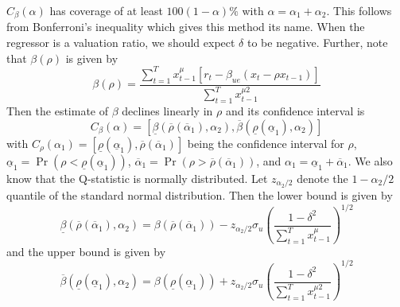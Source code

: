 \documentclass{article}
\begin{document}
$C_{\beta}(\alpha)$ has coverage of at least $100(1-\alpha) \%$ with $\alpha=\alpha_{1}+\alpha_{2}$. This follows from Bonferroni's inequality which gives this method its name.  
When the regressor is a valuation ratio, we should expect $\delta$ to be negative. Further, note that $\beta(\rho)$ is given by 
\begin{equation}
\beta(\rho)=\frac{\sum_{t=1}^{T} x_{t-1}^{\mu}\left[r_{t}-\beta_{u e}\left(x_{t}-\rho x_{t-1}\right)\right]}{\sum_{t=1}^{T} x_{t-1}^{\mu 2}}
\end{equation}
Then the estimate of $\beta$ declines linearly in $\rho$ and its confidence interval is 
\begin{equation}
C_{\beta}(\alpha)=\left[\underline{\beta}\left(\overline{\rho}\left(\overline{\alpha}_{1}\right), \alpha_{2}\right), \overline{\beta}\left(\underline{\rho}\left(\underline{\alpha}_{1}\right), \alpha_{2}\right)\right]
\end{equation}
with $C_{\rho}\left(\alpha_{1}\right)= \left[\underline{\rho}\left(\underline{\alpha}_{1}\right), \overline{\rho}\left(\overline{\alpha}_{1}\right)\right]$ being the confidence interval for $\rho$, $\underline{\alpha}_{1}=\operatorname{Pr}\left(\rho<\underline{\rho}\left(\underline{\alpha}_{1}\right)\right)$, $\overline{\alpha}_{1}=\operatorname{Pr}\left(\rho>\overline{\rho}\left(\overline{\alpha}_{1}\right)\right)$, and $\alpha_{1}=\underline{\alpha}_{1}+\overline{\alpha}_{1}$. We also know that the Q-statistic is normally distributed. Let $z_{\alpha_{2} / 2}$ denote the $1-\alpha_{2} / 2$ quantile of the standard normal distribution. Then the lower bound is given by
\begin{equation}
\underline{\beta}\left(\overline{\rho}\left(\overline{\alpha}_{1}\right), \alpha_{2}\right)=\beta \left(\overline{\rho}\left(\overline{\alpha}_{1}\right) \right)-z_{\alpha_{2} / 2} \sigma_{u}\left(\frac{1-\delta^{2}}{\sum_{t=1}^{T} x_{t-1}^{\mu}}\right)^{1 / 2}
\end{equation}
and the upper bound is given by
\begin{equation}
\overline{\beta}\left(\underline{\rho}\left(\underline{\alpha}_{1}\right), \alpha_{2}\right)=\beta \left(\underline{\rho}\left(\underline{\alpha}_{1}\right) \right)+z_{\alpha_{2} / 2} \sigma_{u}\left(\frac{1-\delta^{2}}{\sum_{t=1}^{T} x_{t-1}^{\mu 2}}\right)^{1 / 2}
\end{equation}
\end{document}

